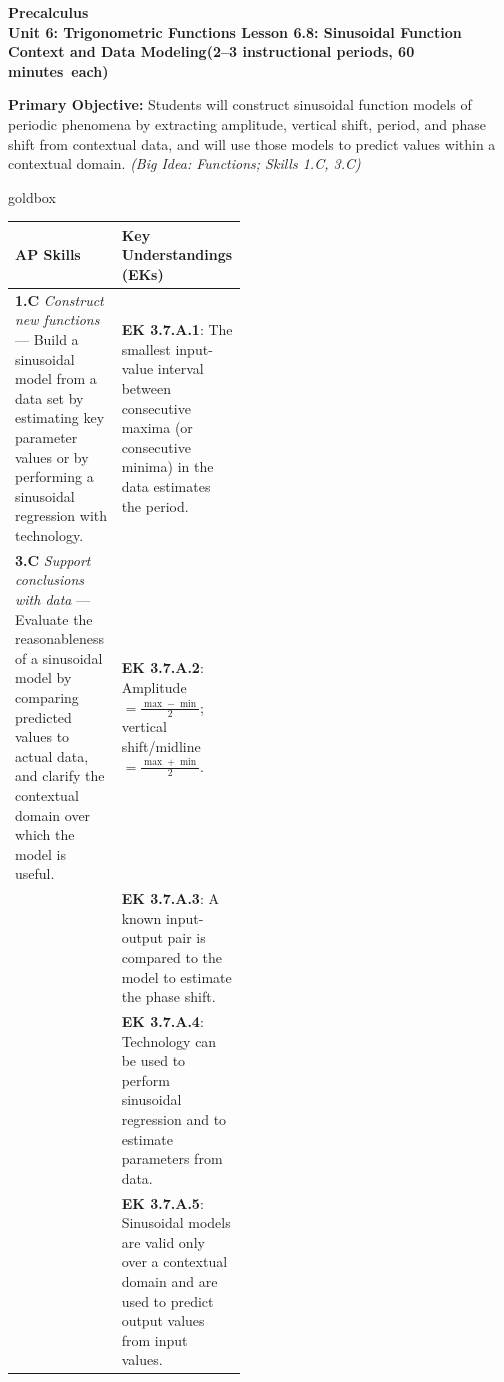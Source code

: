 \documentclass[10pt]{article}
\newcommand{\CourseName}{Precalculus}
\newcommand{\MeetingLength}{60 minutes}
\newcommand{\UnitNumberName}{Unit 6: Trigonometric Functions \quad}
\newcommand{\LessonNumberName}{Lesson 6.8: Sinusoidal Function Context and Data Modeling}
\begin{document}
\begin{center}
  {\Large\bfseries \CourseName} \\[4pt]
  {\small\bfseries \UnitNumberName \LessonNumberName \quad (2--3 instructional periods, \MeetingLength\ each)}
\end{center}

\begin{tcolorbox}[colback=sky, colframe=navy, boxrule=0.9pt, arc=2mm,
    left=2mm, right=2mm, top=1.5mm, bottom=1.5mm]
  \textbf{Primary Objective:} Students will construct sinusoidal function models
  of periodic phenomena by extracting amplitude, vertical shift, period, and
  phase shift from contextual data, and will use those models to predict values
  within a contextual domain.
  \textit{(Big Idea: Functions; Skills 1.C, 3.C)}
\end{tcolorbox}

\vspace{0.08in}

\begin{skillbox}{goldbox}
\begin{tabularx}{\linewidth}{@{} p{0.46\linewidth} X @{}}
\textbf{AP Skills} & \textbf{Key Understandings (EKs)} \\
\midrule
\textbf{1.C} \textit{Construct new functions} ---
  Build a sinusoidal model from a data set by estimating key parameter values
  or by performing a sinusoidal regression with technology.
&
\textbf{EK 3.7.A.1}: The smallest input-value interval between consecutive
  maxima (or consecutive minima) in the data estimates the period. \\[4pt]

\textbf{3.C} \textit{Support conclusions with data} ---
  Evaluate the reasonableness of a sinusoidal model by comparing predicted
  values to actual data, and clarify the contextual domain over which the
  model is useful.
&
\textbf{EK 3.7.A.2}: Amplitude $= \tfrac{\max - \min}{2}$; vertical
  shift/midline $= \tfrac{\max + \min}{2}$. \\[4pt]

&
\textbf{EK 3.7.A.3}: A known input-output pair is compared to the model to
  estimate the phase shift. \\[4pt]

&
\textbf{EK 3.7.A.4}: Technology can be used to perform sinusoidal regression
  and to estimate parameters from data. \\[4pt]

&
\textbf{EK 3.7.A.5}: Sinusoidal models are valid only over a contextual domain
  and are used to predict output values from input values. \\
\end{tabularx}
\end{skillbox}
\end{document}
